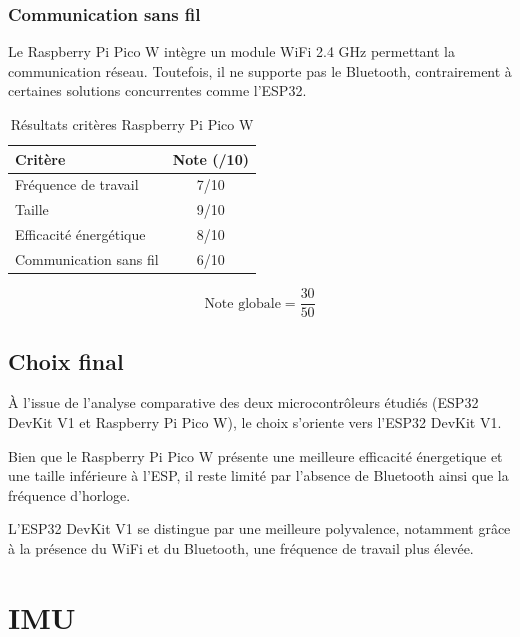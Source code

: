 \subsubsection{Communication sans fil}
Le Raspberry Pi Pico W intègre un module WiFi 2.4 GHz permettant la communication réseau. Toutefois, il ne supporte pas le Bluetooth, contrairement à certaines solutions concurrentes comme l'ESP32.

\begin{table}[H]
    \centering
    \begin{tabular}{|l|c|}
        \hline
        \textbf{Critère} & \textbf{Note (/10)} \\
        \hline
        Fréquence de travail & 7/10 \\
        \hline
        Taille & 9/10 \\
        \hline
        Efficacité énergétique & 8/10 \\
        \hline
        Communication sans fil & 6/10 \\
        \hline
    \end{tabular}
    \caption{Résultats critères Raspberry Pi Pico W}
    \label{tab:pico_results}
\end{table}

$$
\text{Note globale} = \frac{30}{50}
$$

\subsection{Choix final}

À l'issue de l'analyse comparative des deux microcontrôleurs étudiés (ESP32 DevKit V1 et Raspberry Pi Pico W), le choix s'oriente vers l'ESP32 DevKit V1.

Bien que le Raspberry Pi Pico W présente une meilleure efficacité énergetique et une taille inférieure à l'ESP, il reste limité par l'absence de Bluetooth ainsi que la fréquence d'horloge.

L'ESP32 DevKit V1 se distingue par une meilleure polyvalence, notamment grâce à la présence du WiFi et du Bluetooth, une fréquence de travail plus élevée.


\section{IMU}
